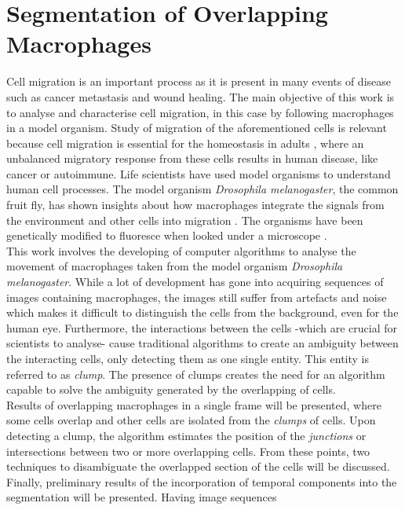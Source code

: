   \section*{Segmentation of Overlapping Macrophages}
%
Cell migration is an important process as it is present in many events of 
disease such as cancer metastasis and wound healing. 
The main objective of this work is to analyse and characterise cell 
migration, in this case by following macrophages in a model organism.
Study of migration of the aforementioned cells is relevant because 
cell migration is essential for the homeostasis in adults \cite{pocha2014}, 
where an unbalanced migratory response from these cells results in 
human disease, like cancer or autoimmune.
Life scientists have used model organisms to understand human cell processes.
The model organism \emph{Drosophila melanogaster}, the common fruit fly,
has shown insights about how macrophages integrate the signals
from the environment and other cells into migration \cite{wood2017}.
The organisms have been genetically modified to fluoresce
when looked under a microscope \cite{Stramer2010}.
\medskip\\
%
This work involves the developing of computer algorithms to analyse the
movement of macro\-phages taken from the model organism
\emph{Drosophila melanogaster}. While a lot of development
has gone into acquiring sequences of images containing macrophages,
the images still suffer from artefacts and noise which makes it difficult
to distinguish the cells from the background, even for the human eye.
Furthermore, the interactions between the cells -which are crucial for scientists
to analyse- cause traditional algorithms \cite{Henry2013,lu2015,Caselles}
to create an ambiguity between the interacting cells, only detecting them 
as one single entity. This entity is referred to as \emph{clump}. 
The presence of clumps creates the need for an algorithm capable to solve 
the ambiguity generated by the overlapping of cells.
\medskip\\
%
Results of overlapping macrophages in a single frame will be
presented, where some cells overlap and other cells are
isolated from the \emph{clumps} of cells. Upon detecting a clump,
the algorithm estimates the position of the \emph{junctions} or intersections
between two or more overlapping cells. From these points, two techniques
to disambiguate the overlapped section of the cells will be discussed.
Finally, preliminary results of the incorporation of temporal components
into the segmentation will be presented. Having image sequences 
